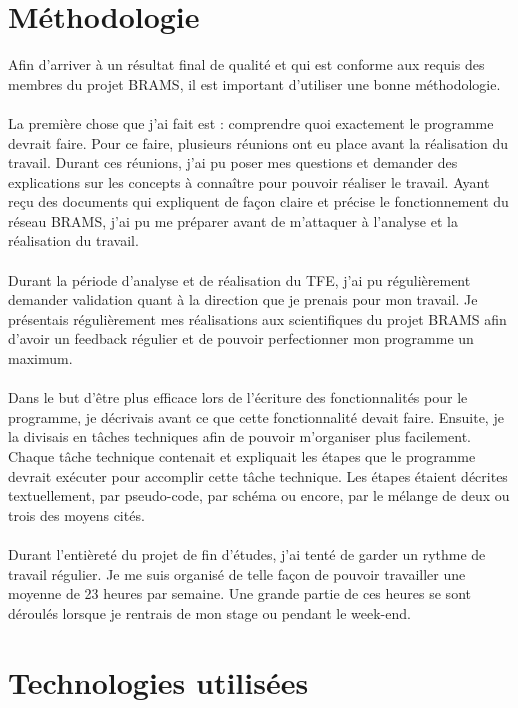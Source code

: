 \documentclass[11pt]{article}
\begin{document}
\newpage

\section{Méthodologie}

Afin d'arriver à un résultat final de qualité et qui est conforme aux requis des membres du projet BRAMS, il est important d'utiliser une bonne méthodologie.\\
\\
La première chose que j'ai fait est : comprendre quoi exactement le programme devrait faire.
Pour ce faire, plusieurs réunions ont eu place avant la réalisation du travail.
Durant ces réunions, j'ai pu poser mes questions et demander des explications sur les concepts à connaître pour pouvoir réaliser le travail.
Ayant reçu des documents qui expliquent de façon claire et précise le fonctionnement du réseau BRAMS, j'ai pu me préparer avant de m'attaquer à l'analyse et la réalisation du travail.\\
\\
Durant la période d'analyse et de réalisation du TFE, j'ai pu régulièrement demander validation quant à la direction que je prenais pour mon travail.
Je présentais régulièrement mes réalisations aux scientifiques du projet BRAMS afin d'avoir un feedback régulier et de pouvoir perfectionner mon programme un maximum.\\
\\
Dans le but d'être plus efficace lors de l'écriture des fonctionnalités pour le programme, je décrivais avant ce que cette fonctionnalité devait faire.
Ensuite, je la divisais en tâches techniques afin de pouvoir m'organiser plus facilement.
Chaque tâche technique contenait et expliquait les étapes que le programme devrait exécuter pour accomplir cette tâche technique.
Les étapes étaient décrites textuellement, par pseudo-code, par schéma ou encore, par le mélange de deux ou trois des moyens cités.\\
\\
Durant l'entièreté du projet de fin d'études, j'ai tenté de garder un rythme de travail régulier.
Je me suis organisé de telle façon de pouvoir travailler une moyenne de 23 heures par semaine.
Une grande partie de ces heures se sont déroulés lorsque je rentrais de mon stage ou pendant le week-end.\\

\newpage

\section{Technologies utilisées}
\end{document}
